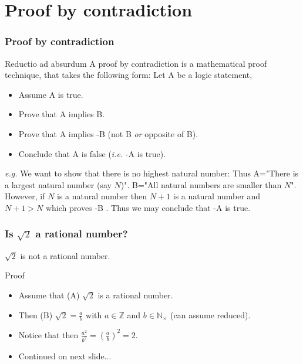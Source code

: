 \documentclass{beamer}[10]
\begin{document}
\section{Proof by contradiction}
\begin{frame}
	\frametitle{Proof by contradiction}
	\begin{block}{Reductio ad absurdum}
		A proof by contradiction is a mathematical proof technique, that takes the following form: Let A be a logic statement,\begin{itemize}
			\item Assume A is true.\\
			\item Prove that A implies B.\\
			\item Prove that A implies -B (not B \emph{or} opposite of B).\\
			\item Conclude that A is false (\emph{i.e.} -A is true).
		\end{itemize}
		\emph{e.g.} We want to show that there is no highest natural number:
		Thus A="There is a largest natural number (say $ N $)". B="All natural numbers are smaller than $ N $". However, if $ N $ is a natural number then $ N+1 $ is a natural number and $ N+1>N $ which proves -B . Thus we may conclude that -A is true.
	\end{block}
\end{frame}
\begin{frame}
	\frametitle{Is $ \sqrt{2} $ a rational number?}
	\begin{theorem}
		$ \sqrt{2} $ is not a rational number.
	\end{theorem}
	\begin{block}{Proof}
		\begin{itemize}
			\item Assume that (A) $ \sqrt{2} $ is a rational number.\\
			\item Then (B) $ \sqrt{2}=\frac{a}{b} $ with $ a\in\mathbb{Z} $ and $ b\in\mathbb{N}_{\times} $ (can assume reduced).\\
			\item Notice that then $ \frac{a^2}{b^2}=\left(\frac{a}{b}\right)^2=2 $.\\
			 \item Continued on next slide...
		\end{itemize}
	\end{block}
\end{frame}
\end{document}
